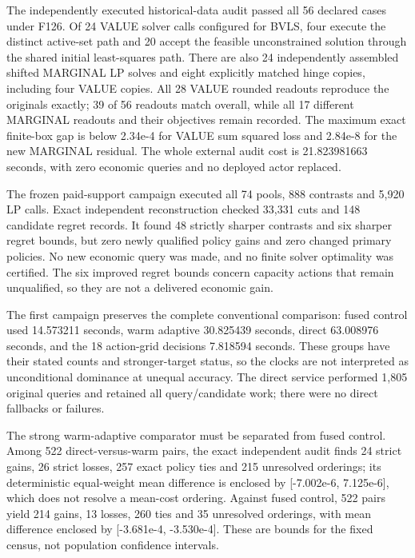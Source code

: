The independently executed historical-data audit passed all 56 declared cases under F126. Of 24 VALUE solver calls configured for BVLS, four execute the distinct active-set path and 20 accept the feasible unconstrained solution through the shared initial least-squares path. There are also 24 independently assembled shifted MARGINAL LP solves and eight explicitly matched hinge copies, including four VALUE copies. All 28 VALUE rounded readouts reproduce the originals exactly; 39 of 56 readouts match overall, while all 17 different MARGINAL readouts and their objectives remain recorded. The maximum exact finite-box gap is below 2.34e-4 for VALUE sum squared loss and 2.84e-8 for the new MARGINAL residual. The whole external audit cost is 21.823981663 seconds, with zero economic queries and no deployed actor replaced.\par
The frozen paid-support campaign executed all 74 pools, 888 contrasts and 5,920 LP calls. Exact independent reconstruction checked 33,331 cuts and 148 candidate regret records. It found 48 strictly sharper contrasts and six sharper regret bounds, but zero newly qualified policy gains and zero changed primary policies. No new economic query was made, and no finite solver optimality was certified. The six improved regret bounds concern capacity actions that remain unqualified, so they are not a delivered economic gain.\par
The first campaign preserves the complete conventional comparison: fused control used 14.573211 seconds, warm adaptive 30.825439 seconds, direct 63.008976 seconds, and the 18 action-grid decisions 7.818594 seconds. These groups have their stated counts and stronger-target status, so the clocks are not interpreted as unconditional dominance at unequal accuracy. The direct service performed 1,805 original queries and retained all query/candidate work; there were no direct fallbacks or failures.\par
The strong warm-adaptive comparator must be separated from fused control. Among 522 direct-versus-warm pairs, the exact independent audit finds 24 strict gains, 26 strict losses, 257 exact policy ties and 215 unresolved orderings; its deterministic equal-weight mean difference is enclosed by [-7.002e-6, 7.125e-6], which does not resolve a mean-cost ordering. Against fused control, 522 pairs yield 214 gains, 13 losses, 260 ties and 35 unresolved orderings, with mean difference enclosed by [-3.681e-4, -3.530e-4]. These are bounds for the fixed census, not population confidence intervals.\par
